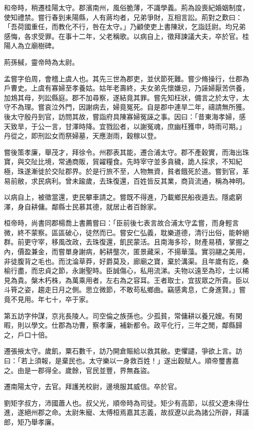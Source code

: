 \begin{pinyinscope}
和帝時，稍遷桂陽太守。郡濱南州，風俗脆薄，不識學義。荊為設喪紀婚姻制度，使知禮禁。嘗行春到耒陽縣，人有蔣均者，兄弟爭財，互相言訟。荊對之歎曰：「吾荷國重任，而教化不行，咎在太守。」乃顧使吏上書陳狀，乞詣廷尉。均兄弟感悔，各求受罪。在事十二年，父老稱歌。以病自上，徵拜諫議大夫，卒於官。桂陽人為立廟樹碑。

荊孫戫，靈帝時為太尉。

孟嘗字伯周，會稽上虞人也。其先三世為郡吏，並伏節死難。嘗少脩操行，仕郡為戶曹史。上虞有寡婦至孝養姑。姑年老壽終，夫女弟先懷嫌忌，乃誣婦厭苦供養，加鴆其母，列訟縣庭。郡不加尋察，遂結竟其罪。嘗先知枉狀，備言之於太守，太守不為理。嘗哀泣外門，因謝病去，婦竟冤死。自是郡中連旱二年，禱請無所獲。後太守殷丹到官，訪問其故，嘗詣府具陳寡婦冤誣之事。因曰：「昔東海孝婦，感天致旱，于公一言，甘澤時降。宜戮訟者，以謝冤魂，庶幽枉獲申，時雨可期。」丹從之，即刑訟女而祭婦墓，天應澍雨，穀稼以登。

嘗後策孝廉，舉茂才，拜徐令。州郡表其能，遷合浦太守。郡不產穀實，而海出珠寶，與交阯比境，常通商販，貿糴糧食。先時宰守並多貪穢，詭人採求，不知紀極，珠遂漸徙於交阯郡界。於是行旅不至，人物無資，貧者餓死於道。嘗到官，革易前敝，求民病利。曾未踰歲，去珠復還，百姓皆反其業，商貨流通，稱為神明。

以病自上，被徵當還，吏民攀車請之。嘗既不得進，乃載鄉民船夜遁去。隱處窮澤，身自耕傭。鄰縣士民慕其德，就居止者百餘家。

桓帝時，尚書同郡楊喬上書薦嘗曰：「臣前後七表言故合浦太守孟嘗，而身輕言微，終不蒙察。區區破心，徒然而已。嘗安仁弘義，耽樂道德，清行出俗，能幹絕群。前更守宰，移風改政，去珠復還，飢民蒙活。且南海多珍，財產易積，掌握之內，價盈兼金，而嘗單身謝病，躬耕壟次，匿景藏采，不揚華藻。實羽翮之美用，非徒腹背之毛也。而沈淪草莽，好爵莫及，廊廟之寶，棄於溝渠。且年歲有訖，桑榆行盡，而忠貞之節，永謝聖時。臣誠傷心，私用流涕。夫物以遠至為珍，士以稀見為貴。槃木朽株，為萬乘用者，左右為之容耳。王者取士，宜拔眾之所貴。臣以斗筲之姿，趨走日月之側。思立微節，不敢苟私鄉曲。竊感禽息，亡身進賢。」嘗竟不見用。年七十，卒于家。

第五訪字仲謀，京兆長陵人。司空倫之族孫也。少孤貧，常傭耕以養兄嫂。有閑暇，則以學文。仕郡為功曹，察孝廉，補新都令。政平化行，三年之閒，鄰縣歸之，戶口十倍。

遷張掖太守。歲飢，粟石數千，訪乃開倉賑給以救其敝。吏懼譴，爭欲上言。訪曰：「若上須報，是棄民也。太守樂以一身救百姓！」遂出穀賦人。順帝璽書嘉之。由是一郡得全。歲餘，官民並豐，界無姦盜。

遷南陽太守，去官。拜護羌校尉，邊境服其威信。卒於官。

劉矩字叔方，沛國蕭人也。叔父光，順帝時為司徒。矩少有高節，以叔父遼未得仕進，遂絕州郡之命。太尉朱寵、太傅桓焉嘉其志義，故叔遼以此為諸公所辟，拜議郎，矩乃舉孝廉。


\end{pinyinscope}
